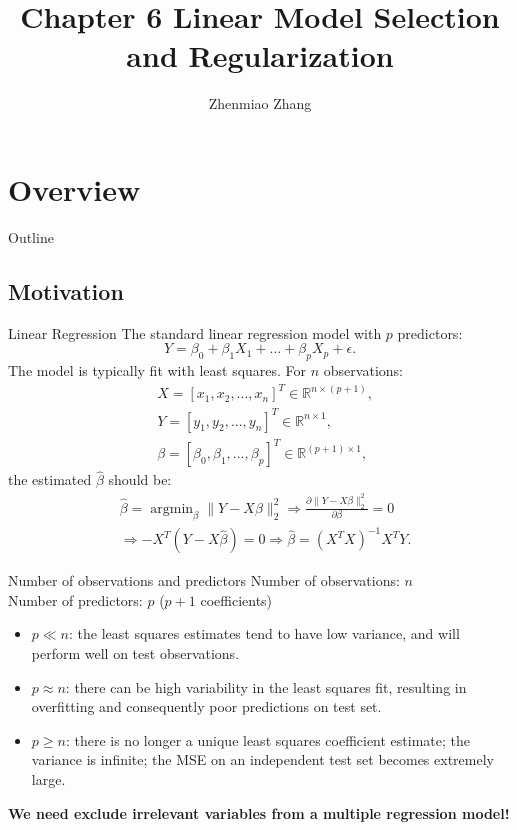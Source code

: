 \documentclass{beamer}
\title{Chapter 6 Linear Model Selection and Regularization}
\author{Zhenmiao Zhang}
\begin{document}
	\begin{frame}
	    \maketitle
	\end{frame}
	
	\section{Overview}
	
	\begin{frame}{Outline}
		\tableofcontents
	\end{frame}

	\subsection{Motivation}
	
	\begin{frame}{Linear Regression}
		The standard linear regression model with $p$ predictors:
		\[
		Y=\beta_0 + \beta_1X_1+ ... + \beta_pX_p + \epsilon .
		\]
		The model is typically fit with least squares. For $n$ observations:
		\begin{align*}
			&X=[x_1, x_2, ..., x_n]^T \in \mathbb{R}^{n\times (p+1)}, \\
			&Y=[y_1, y_2, ..., y_n]^T \in \mathbb{R}^{n\times 1}, \\
			&\beta=[\beta_0, \beta_1, ..., \beta_p]^T \in \mathbb{R}^{(p+1)\times 1},
		\end{align*}
		the estimated $\hat{\beta}$ should be:
		\begin{align*}
			&\hat{\beta} = \mathop{\arg\min}_{\beta} \|Y-X\beta\|_2^2 \Rightarrow \frac{\partial \|Y-X\beta\|_2^2}{\partial \beta}=0 \\
			&\Rightarrow -X^T(Y-X\hat{\beta})=0 \Rightarrow \hat{\beta}=(X^TX)^{-1}X^TY.
		\end{align*}
	\end{frame}

	\begin{frame}{Number of observations and predictors}
		Number of observations: $n$\\
		Number of predictors: $p$ ($p+1$ coefficients)
		\begin{itemize}
			\item $p \ll n$: the least squares estimates tend to have low variance, and will perform well on test observations.
			\item $p\approx n$: there can be high variability in the least squares ﬁt, resulting in overﬁtting and consequently poor predictions on test set.
			\item $p \geq n$: there is no longer a unique least squares coefficient estimate; the variance is infinite; the MSE on an independent test set becomes extremely large.
		\end{itemize}
		\textbf{We need exclude irrelevant variables from a multiple regression model!}
	\end{frame}
	
\end{document}
